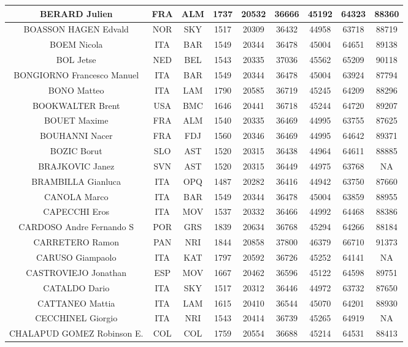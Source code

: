 \documentclass[8pt]{article}
\begin{document}
\begin{table}[h]
\begin{tabular}{|c|c|c|c|c|c|c|c|c|}
BERARD Julien &FRA & ALM & 1737 & 20532 & 36666 & 45192 & 64323 & 88360\\ \hline
BOASSON HAGEN Edvald &NOR & SKY & 1517 & 20309 & 36432 & 44958 & 63718 & 88719\\ \hline
BOEM Nicola &ITA & BAR & 1549 & 20344 & 36478 & 45004 & 64651 & 89138\\ \hline
BOL Jetse &NED & BEL & 1543 & 20335 & 37036 & 45562 & 65209 & 90118\\ \hline
BONGIORNO Francesco Manuel &ITA & BAR & 1549 & 20344 & 36478 & 45004 & 63924 & 87794\\ \hline
BONO Matteo &ITA & LAM & 1790 & 20585 & 36719 & 45245 & 64209 & 88296\\ \hline
BOOKWALTER Brent &USA & BMC & 1646 & 20441 & 36718 & 45244 & 64720 & 89207\\ \hline
BOUET Maxime &FRA & ALM & 1540 & 20335 & 36469 & 44995 & 63755 & 87625\\ \hline
BOUHANNI Nacer &FRA & FDJ & 1560 & 20346 & 36469 & 44995 & 64642 & 89371\\ \hline
BOZIC Borut &SLO & AST & 1520 & 20315 & 36438 & 44964 & 64611 & 88885\\ \hline
BRAJKOVIC Janez &SVN & AST & 1520 & 20315 & 36449 & 44975 & 63768 & NA\\ \hline
BRAMBILLA Gianluca &ITA & OPQ & 1487 & 20282 & 36416 & 44942 & 63750 & 87660\\ \hline
CANOLA Marco &ITA & BAR & 1549 & 20344 & 36478 & 45004 & 63859 & 88955\\ \hline
CAPECCHI Eros &ITA & MOV & 1537 & 20332 & 36466 & 44992 & 64468 & 88386\\ \hline
CARDOSO Andre Fernando S &POR & GRS & 1839 & 20634 & 36768 & 45294 & 64266 & 88184\\ \hline
CARRETERO Ramon &PAN & NRI & 1844 & 20858 & 37800 & 46379 & 66710 & 91373\\ \hline
CARUSO Giampaolo &ITA & KAT & 1797 & 20592 & 36726 & 45252 & 64141 & NA\\ \hline
CASTROVIEJO Jonathan &ESP & MOV & 1667 & 20462 & 36596 & 45122 & 64598 & 89751\\ \hline
CATALDO Dario &ITA & SKY & 1517 & 20312 & 36446 & 44972 & 63732 & 87650\\ \hline
CATTANEO Mattia &ITA & LAM & 1615 & 20410 & 36544 & 45070 & 64201 & 88930\\ \hline
CECCHINEL Giorgio &ITA & NRI & 1543 & 20414 & 36739 & 45265 & 64919 & NA\\ \hline
CHALAPUD GOMEZ Robinson E. &COL & COL & 1759 & 20554 & 36688 & 45214 & 64531 & 88413\\ \hline

\end{tabular}
\end{table}
\end{document}
